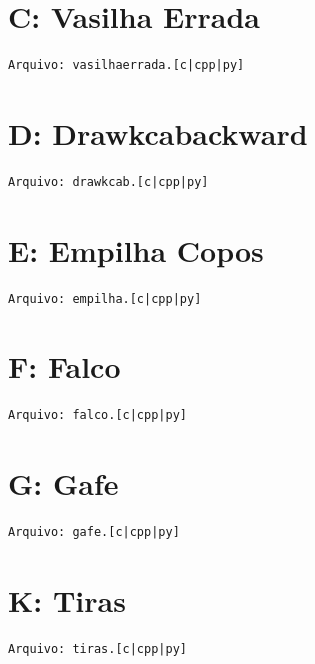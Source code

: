 \documentclass[12pt,oneside]{article} %
\begin{document}
\newpage
\section*{C: Vasilha Errada } %
\vspace{-0.52cm}
\noindent \begin{verbatim}Arquivo: vasilhaerrada.[c|cpp|py]\end{verbatim}


\newpage
\section*{D: Drawkcabackward} %
\vspace{-0.52cm}
\noindent \begin{verbatim}Arquivo: drawkcab.[c|cpp|py]\end{verbatim}


\newpage
\section*{E: Empilha Copos} %
\vspace{-0.52cm}
\noindent \begin{verbatim}Arquivo: empilha.[c|cpp|py]\end{verbatim}


\newpage
\section*{F: Falco} %
\vspace{-0.52cm}
\noindent \begin{verbatim}Arquivo: falco.[c|cpp|py]\end{verbatim}


\newpage
\section*{G: Gafe} %
\vspace{-0.52cm}
\noindent \begin{verbatim}Arquivo: gafe.[c|cpp|py]\end{verbatim}


\newpage
\section*{K: Tiras } %
\vspace{-0.52cm}
\noindent \begin{verbatim}Arquivo: tiras.[c|cpp|py]\end{verbatim}

\end{document}

